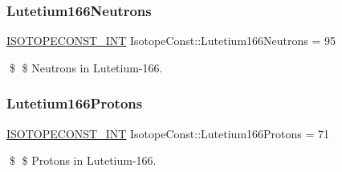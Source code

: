 \subsubsection{\texorpdfstring{Lutetium166\+Neutrons}{Lutetium166Neutrons}}
{\footnotesize\ttfamily \mbox{\hyperlink{group___isotope_const-_macros_ga5f18360b3e99483a35c32d789e62621c}{I\+S\+O\+T\+O\+P\+E\+C\+O\+N\+S\+T\+\_\+\+I\+NT}} Isotope\+Const\+::\+Lutetium166\+Neutrons = 95}

\$ \$ Neutrons in Lutetium-\/166. \mbox{\label{group___isotope_const-_lutetium-_lu166_gaf948ab09309e65ba32b2ace2bdb31975}} 
\subsubsection{\texorpdfstring{Lutetium166\+Protons}{Lutetium166Protons}}
{\footnotesize\ttfamily \mbox{\hyperlink{group___isotope_const-_macros_ga5f18360b3e99483a35c32d789e62621c}{I\+S\+O\+T\+O\+P\+E\+C\+O\+N\+S\+T\+\_\+\+I\+NT}} Isotope\+Const\+::\+Lutetium166\+Protons = 71}

\$ \$ Protons in Lutetium-\/166. 